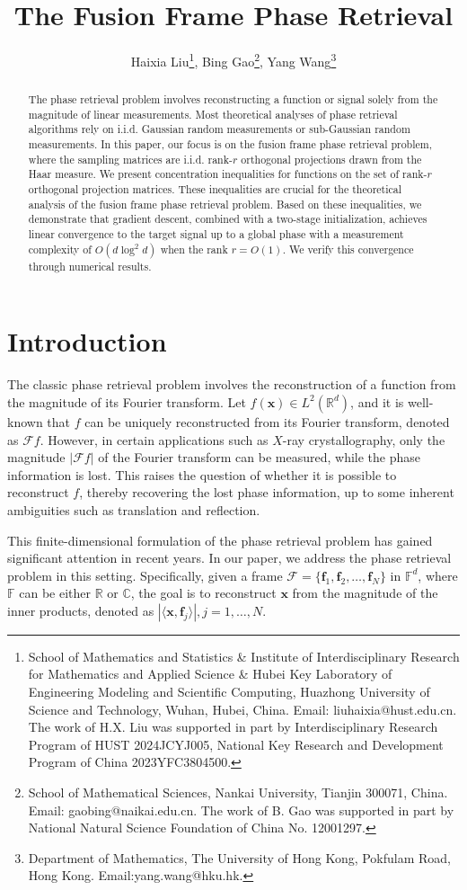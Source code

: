 \documentclass{article}
\title{The Fusion Frame Phase Retrieval}
\author{
Haixia Liu\thanks{School of Mathematics and Statistics  \& Institute of Interdisciplinary Research for Mathematics and Applied Science \& Hubei Key Laboratory of Engineering Modeling and Scientific Computing, Huazhong University of Science and Technology, Wuhan, Hubei, China. Email: liuhaixia@hust.edu.cn. The work of H.X. Liu was supported in part by Interdisciplinary Research Program of HUST 2024JCYJ005, National Key Research and Development Program of China 2023YFC3804500.},
Bing Gao\thanks{School of Mathematical Sciences, Nankai University, Tianjin 300071, China. Email: gaobing@naikai.edu.cn. The work of B. Gao was supported in part by National Natural Science Foundation of China No. 12001297.},
Yang Wang\thanks{Department of Mathematics, The University of Hong Kong, Pokfulam Road, Hong Kong. Email:yang.wang@hku.hk.}}
\newcommand{\bbF}{{\mathbb F}}
\newcommand{\vx}{{\mathbf x}}
\newcommand{\0}{{\mathbf 0}}
\numberwithin{equation}{section}
\begin{document}
\maketitle
\begin{abstract}
The phase retrieval problem involves reconstructing a function or signal solely from the magnitude of linear measurements. Most theoretical analyses of phase retrieval algorithms rely on i.i.d. Gaussian random measurements or sub-Gaussian random measurements. In this paper, our focus is on the fusion frame phase retrieval problem, where the sampling matrices are i.i.d. rank-$r$ orthogonal projections drawn from the Haar measure. We present concentration inequalities for functions on the set of rank-$r$ orthogonal projection matrices. These inequalities are crucial for the theoretical analysis of the fusion frame phase retrieval problem. Based on these inequalities, we demonstrate that gradient descent, combined with a two-stage initialization, achieves linear convergence to the target signal up to a global phase with a measurement complexity of $O(d\log^2 d)$ when the rank $r = O(1)$. We verify this convergence through numerical results.
\end{abstract}
	\section{Introduction}
	\setcounter{equation}{0}
	The classic phase retrieval problem involves the reconstruction of a function from the magnitude of its Fourier transform. Let $f(\vx) \in L^2(\mathbb{R}^d)$, and it is well-known that $f$ can be uniquely reconstructed from its Fourier transform, denoted as $\mathcal{F}f$. However, in certain applications such as $X$-ray crystallography, only the magnitude $|\mathcal{F}f|$ of the Fourier transform can be measured, while the phase information is lost. This raises the question of whether it is possible to reconstruct $f$, thereby recovering the lost phase information, up to some inherent ambiguities such as translation and reflection.
	
	This finite-dimensional formulation of the phase retrieval problem has gained significant attention in recent years. In our paper, we address the phase retrieval problem in this setting. Specifically, given a frame $\mathcal{F} = \{\mathbf{f}_1, \mathbf{f}_2, \ldots, \mathbf{f}_N\}$ in $\bbF^d$, where $\bbF$ can be either $\mathbb{R}$ or $\mathbb{C}$, the goal is to reconstruct $\mathbf{x}$ from the magnitude of the inner products, denoted as $|\langle \mathbf{x}, \mathbf{f}_j \rangle|,j=1,\ldots,N$. 
	
\end{document}
